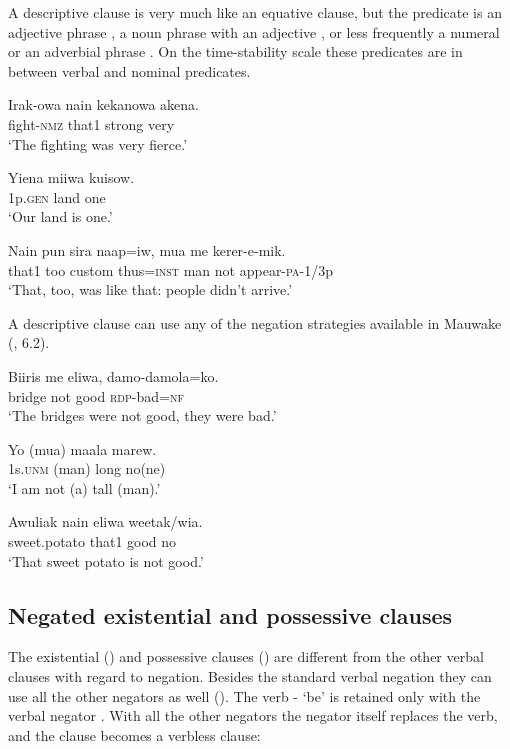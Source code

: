 A descriptive clause is very much like an equative clause, but the predicate is an adjective phrase , a noun phrase with an adjective , or less frequently a numeral  or an adverbial phrase . On the time-stability scale these predicates are in between verbal and nominal predicates. 

\ea%
\label{ex:5:x974}
\gll Irak-owa  nain  kekanowa  akena. \\
     fight-\textsc{nmz}  that1  strong  very \\
\glt `The fighting was very fierce.'
\z

\ea%
\label{ex:5:x979}
\gll Yiena  miiwa  kuisow. \\
     1p.\textsc{gen}  land  one \\
\glt `Our land is one.'
\z

\ea%
\label{ex:5:x985}
\gll Nain  pun  sira  naap=iw,  mua  me  kerer-e-mik. \\
     that1  too  custom  thus=\textsc{inst}  man  not  appear-\textsc{pa}-1/3p \\
\glt `That, too, was like that: people didn't arrive.'
\z

A descriptive clause can use any of the negation strategies available in Mauwake (, 6.2). 

\ea%
\label{ex:5:x990}
\gll Biiris  me  eliwa,  damo-damola=ko. \\
     bridge  not  good  \textsc{rdp}-bad=\textsc{nf} \\
\glt `The bridges were not good, they were bad.'
\z

\ea%
\label{ex:5:x988}
\gll Yo  (mua)  maala  marew. \\
     1s.\textsc{unm}  (man)  long  no(ne) \\
\glt `I am not (a) tall (man).'
\z

\ea%
\label{ex:5:x989}
\gll Awuliak  nain  eliwa  weetak/wia. \\
     sweet.potato  that1  good  no \\
\glt `That sweet potato is not good.'
\z

\subsection{Negated existential and possessive clauses} \label{sec:5.6.3}

The existential () and possessive clauses () are different from the other verbal clauses with regard to negation. Besides the standard verbal negation  they can use all the other negators as well (). The verb - `be' is retained only with the verbal negator . With all the other negators the negator itself replaces the verb, and the clause becomes a verbless clause:

